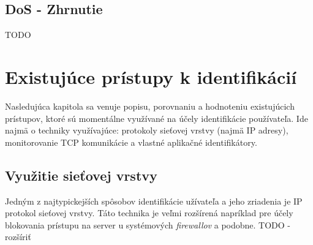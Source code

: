 \documentclass[
  printed, %
  table,   %
  lof,     %
  lot,     %
]{fithesis3}
\begin{document}
\section{DoS - Zhrnutie}
TODO




\chapter{Existujúce prístupy k identifikácií}
\label{ch:existing}
Nasledujúca kapitola sa venuje popisu, porovnaniu a hodnoteniu existujúcich
prístupov, ktoré sú momentálne využívané na účely identifikácie používateľa.
Ide najmä o techniky využívajúce: protokoly sieťovej vrstvy (najmä IP adresy),
monitorovanie TCP komunikácie a vlastné aplikačné identifikátory.

\section{Využitie sieťovej vrstvy}
Jedným z najtypickejších spôsobov identifikácie užívateľa a jeho zriadenia je
IP protokol sieťovej vrstvy. Táto technika je veľmi rozšírená napríklad pre
účely blokovania prístupu na server u systémových \textit{firewallov} a
podobne.
TODO - rozšíriť
\end{document}
